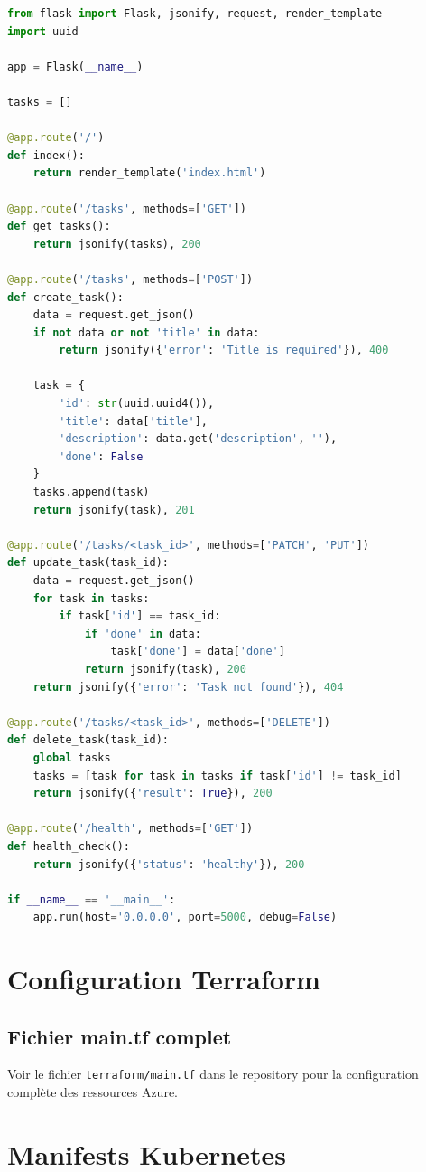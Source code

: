 \documentclass[12pt,a4paper,twoside]{report}
\begin{document}
\begin{lstlisting}[language=Python]
from flask import Flask, jsonify, request, render_template
import uuid

app = Flask(__name__)

tasks = []

@app.route('/')
def index():
    return render_template('index.html')

@app.route('/tasks', methods=['GET'])
def get_tasks():
    return jsonify(tasks), 200

@app.route('/tasks', methods=['POST'])
def create_task():
    data = request.get_json()
    if not data or not 'title' in data:
        return jsonify({'error': 'Title is required'}), 400
    
    task = {
        'id': str(uuid.uuid4()),
        'title': data['title'],
        'description': data.get('description', ''),
        'done': False
    }
    tasks.append(task)
    return jsonify(task), 201

@app.route('/tasks/<task_id>', methods=['PATCH', 'PUT'])
def update_task(task_id):
    data = request.get_json()
    for task in tasks:
        if task['id'] == task_id:
            if 'done' in data:
                task['done'] = data['done']
            return jsonify(task), 200
    return jsonify({'error': 'Task not found'}), 404

@app.route('/tasks/<task_id>', methods=['DELETE'])
def delete_task(task_id):
    global tasks
    tasks = [task for task in tasks if task['id'] != task_id]
    return jsonify({'result': True}), 200

@app.route('/health', methods=['GET'])
def health_check():
    return jsonify({'status': 'healthy'}), 200

if __name__ == '__main__':
    app.run(host='0.0.0.0', port=5000, debug=False)
\end{lstlisting}

\chapter{Configuration Terraform}

\section{Fichier main.tf complet}

Voir le fichier \texttt{terraform/main.tf} dans le repository pour la configuration complète des ressources Azure.

\chapter{Manifests Kubernetes}
\end{document}
